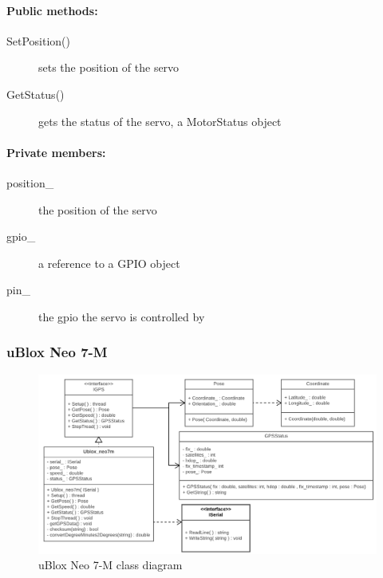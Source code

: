 \paragraph{Public methods:}
\begin{adjustwidth}{2.5em}{0pt}\begin{description}
		\item [SetPosition()] sets the position of the servo
		\item [GetStatus()] gets the status of the servo, a MotorStatus object
\end{description}\end{adjustwidth}

\paragraph{Private members:}
\begin{adjustwidth}{2.5em}{0pt}\begin{description}
		\item [position_] the position of the servo
		\item [gpio_] a reference to a GPIO object
		\item [pin_] the gpio the servo is controlled by
\end{description}\end{adjustwidth}

\subsubsection{uBlox Neo 7-M}

\begin{figure}[H]
\centering
\includegraphics[width=1\linewidth]{Images/Design/ubloxNEO7M_class_diagram}
\caption{uBlox Neo 7-M class diagram}
\label{fig:ubloxneo7m}
\end{figure}

